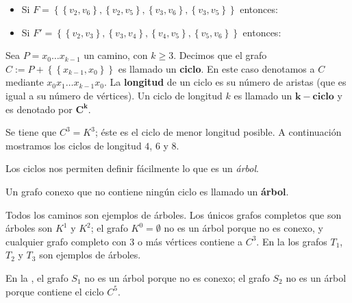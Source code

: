 \begin{Ejm}
   \phantom{0}
   \begin{itemize}
      \item Si $F=\left\lbrace \left\lbrace v_2,v_6\right\rbrace, \left\lbrace v_2,v_5\right\rbrace, \left\lbrace v_3,v_6\right\rbrace, \left\lbrace v_3,v_5\right\rbrace\right\rbrace$ entonces:  
           
      \item Si $F'=\left\lbrace \left\lbrace v_2,v_3\right\rbrace, \left\lbrace v_3,v_4\right\rbrace, \left\lbrace v_4,v_5\right\rbrace, \left\lbrace v_5,v_6 \right\rbrace\right\rbrace$ entonces:
         \vspace{1em}
           
   \end{itemize}
\end{Ejm}
\begin{Def}
   Sea $P=x_0\dots x_{k-1}$ un camino, con $k\geq 3$. Decimos que el grafo $C:=P+\left\lbrace \left\lbrace x_{k-1}, x_0\right\rbrace\right\rbrace$ es llamado un \textbf{ciclo}. En este caso denotamos a $C$ mediante $x_0x_1\dots x_{k-1}x_0$. La \textbf{longitud} de un ciclo es su número de aristas (que es igual a su número de vértices). Un ciclo de longitud $k$ es llamado un $\bm{k-ciclo}$ y es denotado por $\bm{C^k}$. 
\end{Def}
\begin{Ejm}
   Se tiene que $C^3=K^3$; éste es el ciclo de menor longitud posible. A continuación mostramos los ciclos de longitud $4$, $6$ y $8$.
   
\end{Ejm}
Los ciclos nos permiten definir fácilmente lo que es un \textit{árbol}.
\begin{Def}
   Un grafo conexo que no contiene ningún ciclo es llamado un \textbf{árbol}. 
\end{Def}
\begin{Ejm}
   Todos los caminos son ejemplos de árboles. Los únicos grafos completos que son árboles son $K^1$ y $K^2$; el grafo $K^0=\emptyset$ no es un árbol porque no es conexo, y cualquier grafo completo con $3$ o más vértices contiene a $C^3$. En la  los grafos $T_1$, $T_2$ y $T_3$ son ejemplos de árboles.
   
   En la , el grafo $S_1$ no es un árbol porque no es conexo; el grafo $S_2$ no es un árbol porque contiene el ciclo $C^5$.
   
\end{Ejm}
